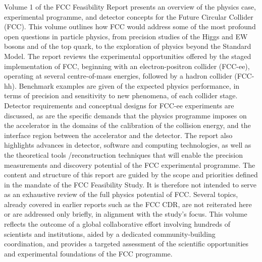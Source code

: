 Volume 1 of the FCC Feasibility Report presents an overview of the physics case, experimental programme, and detector concepts for the Future Circular Collider (FCC). This volume outlines how  FCC would address some of the most profound open questions in particle physics, from precision studies of the Higgs and EW bosons and of the top quark, to the exploration of physics beyond the Standard Model. The report reviews the experimental opportunities offered by the staged implementation of  FCC, beginning with an electron-positron collider (FCC-ee), operating at several centre-of-mass energies, followed by a hadron collider (FCC-hh). Benchmark examples are given of the expected physics performance, in terms of precision and sensitivity to new phenomena, of each collider stage. Detector requirements and conceptual designs for FCC-ee experiments are discussed, as are the specific demands that the physics programme imposes on the accelerator in the domains of the calibration of the collision energy, and the interface region between the accelerator and the detector. The report also highlights advances in detector, software and computing technologies, as well as the theoretical tools /reconstruction techniques that will enable the precision measurements and discovery potential of the FCC experimental programme. The content and structure of this report are guided by the scope and priorities defined in the mandate of the FCC Feasibility Study. It is therefore not intended to serve as an exhaustive review of the full physics potential of FCC. Several topics, already covered in earlier reports such as the FCC CDR, are not reiterated here or are addressed only briefly, in alignment with the study’s focus. This volume reflects the outcome of a global collaborative effort involving hundreds of scientists and institutions, aided by a dedicated community-building coordination, and provides a targeted assessment of the scientific opportunities and experimental foundations of the FCC programme.